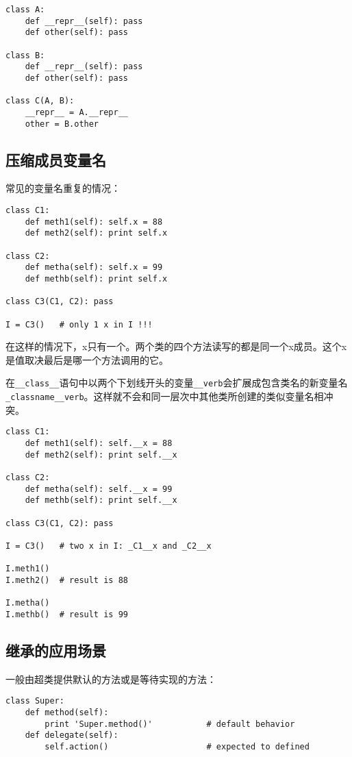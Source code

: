 \begin{lstlisting}
class A:
	def __repr__(self): pass
	def other(self): pass

class B:
	def __repr__(self): pass
	def other(self): pass

class C(A, B):
	__repr__ = A.__repr__
	other = B.other
\end{lstlisting}

\subsection{压缩成员变量名}

常见的变量名重复的情况：

\begin{lstlisting}
class C1:
	def meth1(self): self.x = 88
	def meth2(self): print self.x

class C2:
	def metha(self): self.x = 99
	def methb(self): print self.x

class C3(C1, C2): pass

I = C3()   # only 1 x in I !!!
\end{lstlisting}

在这样的情况下，x只有一个。两个类的四个方法读写的都是同一个x成员。这个x是值取决最后是哪一个方法调用的它。 

在\verb|__class__|语句中以两个下划线开头的变量\verb|__verb|会扩展成包含类名的新变量名\verb|_classname__verb|。这样就不会和同一层次中其他类所创建的类似变量名相冲突。

\begin{lstlisting}
class C1:
	def meth1(self): self.__x = 88
	def meth2(self): print self.__x

class C2:
	def metha(self): self.__x = 99
	def methb(self): print self.__x

class C3(C1, C2): pass

I = C3()   # two x in I: _C1__x and _C2__x

I.meth1()
I.meth2()  # result is 88

I.metha()
I.methb()  # result is 99
\end{lstlisting}


\subsection{继承的应用场景}

一般由超类提供默认的方法或是等待实现的方法：

\begin{lstlisting}
class Super:
	def method(self):
		print 'Super.method()'           # default behavior
	def delegate(self):
		self.action()                    # expected to defined
\end{lstlisting}

